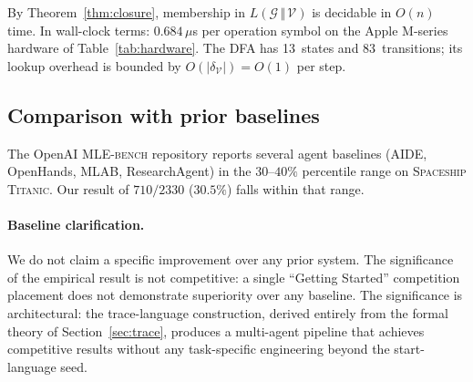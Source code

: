 By Theorem~\ref{thm:closure}, membership in
$L(\mathcal{G}\,\Vert\,\mathcal{V})$ is decidable in $O(n)$ time.
In wall-clock terms: $0.684\,\mu$s per operation symbol on the
Apple M-series hardware of Table~\ref{tab:hardware}.
The DFA has 13~states and 83~transitions; its lookup overhead is
bounded by $O(|\delta_\mathcal{V}|) = O(1)$ per step.

\subsection{Comparison with prior baselines}

The OpenAI \textsc{MLE-bench} repository reports several agent
baselines (AIDE, OpenHands, MLAB, ResearchAgent) in the $30$--$40\%$
percentile range on \textsc{Spaceship Titanic}.  Our result of
$710/2330$ ($30.5\%$) falls within that range.

\paragraph{Baseline clarification.}
We do not claim a specific improvement over any prior system.
The significance of the empirical result is not competitive: a
single ``Getting Started'' competition placement does not demonstrate
superiority over any baseline.  The significance is architectural:
the trace-language construction, derived entirely from the formal
theory of Section~\ref{sec:trace}, produces a multi-agent pipeline
that achieves competitive results without any task-specific
engineering beyond the start-language seed.
